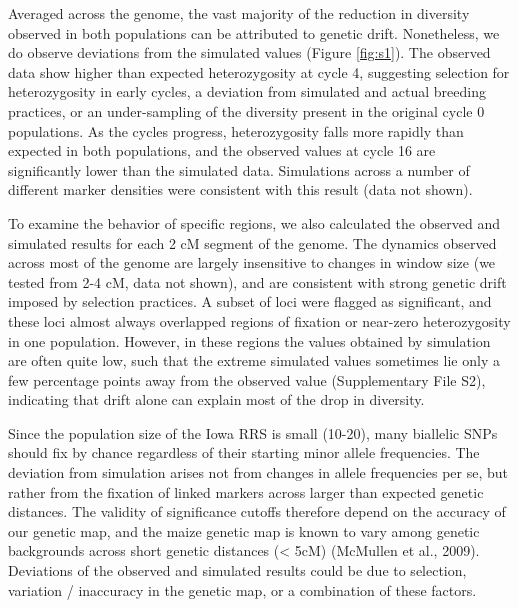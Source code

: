 Averaged across the genome, the vast majority of the reduction in diversity observed in both populations can be attributed to genetic drift. 
Nonetheless, we do observe deviations from the simulated values (Figure \ref{fig:s1}). 
The observed data show higher than expected heterozygosity at cycle 4, suggesting selection for heterozygosity in early cycles, a deviation from simulated and actual breeding practices, or an under-sampling of the diversity present in the original cycle 0 populations. 
As the cycles progress, heterozygosity falls more rapidly than expected in both populations, and the observed values at cycle 16 are significantly lower than the simulated data.  
Simulations across a number of different marker densities were consistent with this result (data not shown). 

To examine the behavior of specific regions, we also calculated the observed and simulated results for each 2 cM segment of the genome. 
The dynamics observed across most of the genome are largely insensitive to changes in window size (we tested from 2-4 cM, data not shown), and are consistent with strong genetic drift imposed by selection practices. 
A subset of loci were flagged as significant, and these loci almost always overlapped regions of fixation or near-zero heterozygosity in one population. 
However, in these regions the values obtained by simulation are often quite low, such that the extreme simulated values sometimes lie only a few percentage points away from the observed value (Supplementary File S2), indicating that drift alone can explain most of the drop in diversity. 

Since the population size of the Iowa RRS is small (10-20), many biallelic SNPs should fix by chance regardless of their starting minor allele frequencies. The deviation from simulation arises not from changes in allele frequencies per se, but rather from the fixation of linked markers across larger than expected genetic distances. 
The validity of significance cutoffs therefore depend on the accuracy of our genetic map, and the maize genetic map is known to vary among genetic backgrounds across short genetic distances (< 5cM) (McMullen et al., 2009). 
Deviations of the observed and simulated results could be due to selection, variation / inaccuracy in the genetic map, or a combination of these factors. 

